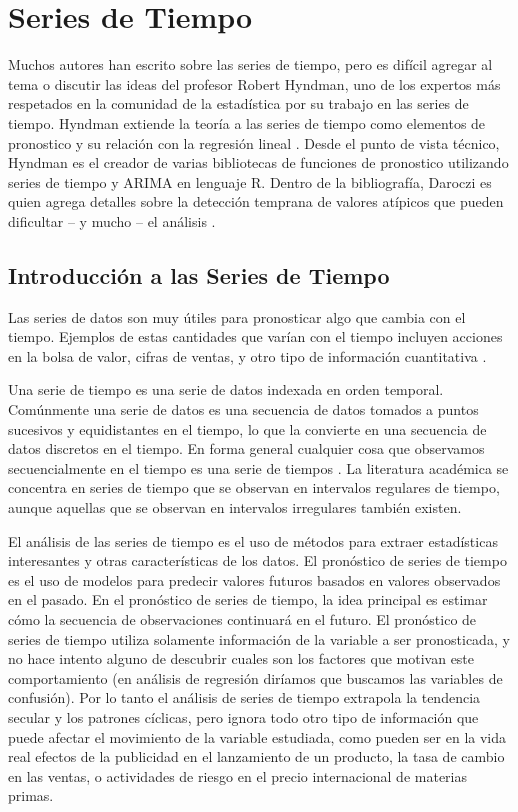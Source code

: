 \pagebreak
\section{Series de Tiempo}
Muchos autores han escrito sobre las series de tiempo, pero es difícil agregar al tema o discutir las ideas del profesor Robert Hyndman, uno de los expertos más respetados en la comunidad de la estadística por su trabajo en las series de tiempo. Hyndman extiende la teoría a las series de tiempo como elementos de pronostico y su relación con la regresión lineal \cite{hyndman}. Desde el punto de vista técnico, Hyndman es el creador de varias bibliotecas de funciones de pronostico utilizando series de tiempo y ARIMA en lenguaje R. Dentro de la bibliografía, Daroczi es quien agrega detalles sobre la detección temprana de valores atípicos que pueden dificultar – y mucho – el análisis \cite{daroczi}.

\subsection{Introducción a las Series de Tiempo}
Las series de datos son muy útiles para pronosticar algo que cambia con el tiempo. Ejemplos de estas cantidades que varían con el tiempo incluyen acciones en la bolsa de valor, cifras de ventas, y otro tipo de información cuantitativa \cite{hyndman}.

Una serie de tiempo es una serie de datos indexada en orden temporal. Comúnmente una serie de datos es una secuencia de datos tomados a puntos sucesivos y equidistantes en el tiempo, lo que la convierte en una secuencia de datos discretos en el tiempo. En forma general cualquier cosa que observamos secuencialmente en el tiempo es una serie de tiempos \cite{hyndman}. La literatura académica se concentra en series de tiempo que se observan en intervalos regulares de tiempo, aunque aquellas que se observan en intervalos irregulares también existen.

El análisis de las series de tiempo es el uso de métodos para extraer estadísticas interesantes y otras características de los datos. El pronóstico de series de tiempo es el uso de modelos para predecir valores futuros basados en valores observados en el pasado. En el pronóstico de series de tiempo, la idea principal es estimar cómo la secuencia de observaciones continuará en el futuro. El pronóstico de series de tiempo utiliza solamente información de la variable a ser pronosticada, y no hace intento alguno de descubrir cuales son los factores que motivan este comportamiento (en análisis de regresión diríamos que buscamos las variables de confusión). Por lo tanto el análisis de series de tiempo extrapola la tendencia secular y los patrones cíclicas, pero ignora todo otro tipo de información que puede afectar el movimiento de la variable estudiada, como pueden ser en la vida real efectos de la publicidad en el lanzamiento de un producto, la tasa de cambio en las ventas, o actividades de riesgo en el precio internacional de materias primas.

